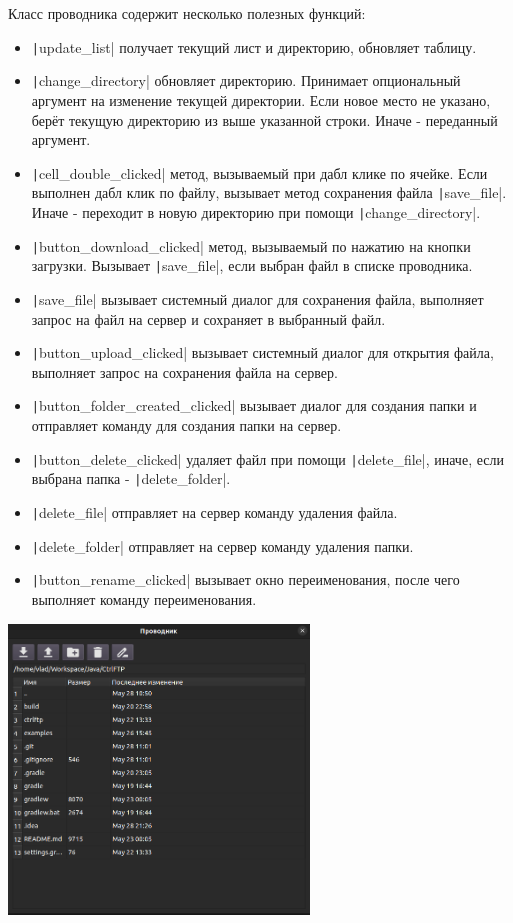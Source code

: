 \documentclass[a4paper,14pt]{extarticle}
\begin{document}
Класс проводника содержит несколько полезных функций:
\begin{itemize}
    \item \texttt|update_list| получает текущий лист и директорию, обновляет таблицу. 
    \item \texttt|change_directory| обновляет директорию. Принимает опциональный аргумент на изменение текущей 
директории. Если новое место не указано, берёт текущую директорию из выше указанной строки. Иначе - переданный аргумент. 
    \item \texttt|cell_double_clicked| метод, вызываемый при дабл клике по ячейке. Если выполнен дабл клик по файлу, 
вызывает метод сохранения файла \texttt|save_file|. Иначе - переходит в новую директорию при помощи \texttt|change_directory|.
    \item \texttt|button_download_clicked| метод, вызываемый по нажатию на кнопки загрузки. Вызывает \texttt|save_file|, 
если выбран файл в списке проводника.
    \item \texttt|save_file| вызывает системный диалог для сохранения файла, выполняет запрос на файл на сервер и сохраняет в выбранный файл.
    \item \texttt|button_upload_clicked| вызывает системный диалог для открытия файла, выполняет запрос на сохранения файла на сервер.
    \item \texttt|button_folder_created_clicked| вызывает диалог для создания папки и отправляет команду для создания папки на сервер.
    \item \texttt|button_delete_clicked| удаляет файл при помощи \texttt|delete_file|, иначе, если выбрана папка
- \texttt|delete_folder|. 
    \item \texttt|delete_file| отправляет на сервер команду удаления файла.
    \item \texttt|delete_folder| отправляет на сервер команду удаления папки.
    \item \texttt|button_rename_clicked| вызывает окно переименования, после чего выполняет команду переименования.
\end{itemize}
\begin{center}
\includegraphics[width=80mm]{explorer_dialog}
\end{center}
\end{document}
